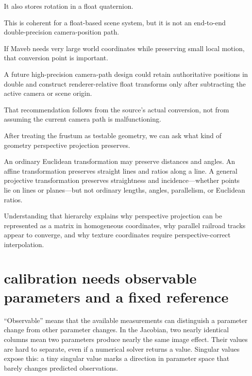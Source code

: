 It also stores rotation in a float quaternion.

This is coherent for a float-based scene system, but it is not an end-to-end double-precision camera-position path.

If Maveb needs very large world coordinates while preserving small local motion, that conversion point is important.

A future high-precision camera-path design could retain authoritative positions in double and construct renderer-relative float transforms only after subtracting the active camera or scene origin.

That recommendation follows from the source's actual conversion, not from assuming the current camera path is malfunctioning.

After treating the frustum as testable geometry, we can ask what kind of geometry perspective projection preserves.

An ordinary Euclidean transformation may preserve distances and angles. An affine transformation preserves straight lines and ratios along a line. A general projective transformation preserves straightness and incidence---whether points lie on lines or planes---but not ordinary lengths, angles, parallelism, or Euclidean ratios.

Understanding that hierarchy explains why perspective projection can be represented as a matrix in homogeneous coordinates, why parallel railroad tracks appear to converge, and why texture coordinates require perspective-correct interpolation.

\section{calibration needs observable parameters and a fixed reference}\label{02-foundations-ii-ch036-calibration-needs-observable-parameters-and-a-fixed-reference}

\hypertarget{02-foundations-ii-ch036-calibration-needs-observable-parameters-and-a-fixed-reference}{}

``Observable'' means that the available measurements can distinguish a parameter change from other parameter changes. In the Jacobian, two nearly identical columns mean two parameters produce nearly the same image effect. Their values are hard to separate, even if a numerical solver returns a value. Singular values expose this: a tiny singular value marks a direction in parameter space that barely changes predicted observations.

